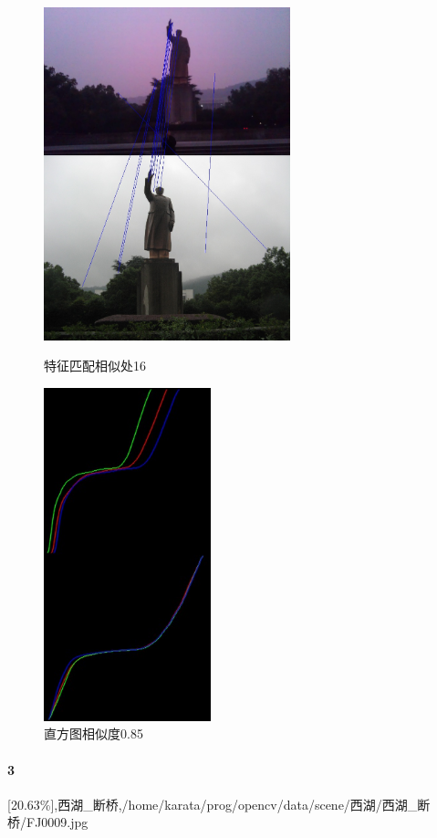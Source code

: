 \begin{figure}[htb]
\begin{minipage}[t]{0.5\linewidth}
\centering
\includegraphics[height=3.8in]{玉泉毛像.jpg.d/im2sift.jpg}
\caption{特征匹配相似处16}
\label{fig:side:a}
\end{minipage}%
\begin{minipage}[t]{0.5\linewidth}
\centering
\includegraphics[height=3.8in]{玉泉毛像.jpg.d/im2hist2.jpg}
\caption{直方图相似度0.85}
\label{fig:side:a}
\end{minipage}%
\end{figure}

\paragraph{3}
[20.63\%],西湖\_断桥,/home/karata/prog/opencv/data/scene/西湖/西湖\_断桥/FJ0009.jpg

